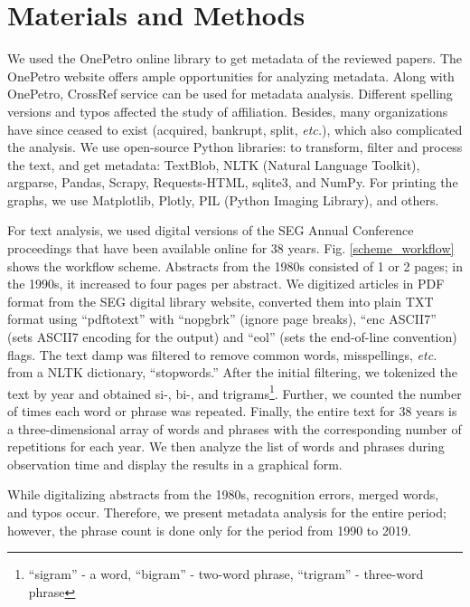 \documentclass[geosciences,article,submit,moreauthors,pdftex]{Definitions/mdpi}
\begin{document}
\section{Materials and Methods}

We used the OnePetro online library \citep{SPE2019} to get metadata of the reviewed papers. The OnePetro website offers ample opportunities for analyzing metadata. Along with OnePetro, CrossRef service can be used for metadata analysis. Different spelling versions and typos affected the study of affiliation. Besides, many organizations have since ceased to exist (acquired, bankrupt, split, \textit{etc.}), which also complicated the analysis. We use open-source Python libraries: to transform, filter and process the text, and get metadata: TextBlob, NLTK (Natural Language Toolkit), argparse, Pandas, Scrapy, Requests-HTML, sqlite3, and NumPy. For printing the graphs, we use Matplotlib, Plotly, PIL (Python Imaging Library), and others.

For text analysis, we used digital versions of the SEG Annual Conference proceedings that have been available online for 38 years. Fig. \ref{scheme_workflow} shows the workflow scheme. Abstracts from the 1980s consisted of 1 or 2 pages; in the 1990s, it increased to four pages per abstract. We digitized articles in PDF format from the SEG digital library website, converted them into plain TXT format using ``pdftotext'' with ``nopgbrk'' (ignore page breaks), ``enc ASCII7'' (sets ASCII7 encoding for the output) and ``eol'' (sets the end-of-line convention) flags. The text damp was filtered to remove common words, misspellings, \textit{etc.} from a NLTK dictionary, ``stopwords.'' After the initial filtering, we tokenized the text by year and obtained si-, bi-, and trigrams\footnote{``sigram'' - a word, ``bigram'' - two-word phrase, ``trigram'' - three-word phrase}. Further, we counted the number of times each word or phrase was repeated. Finally, the entire text for 38 years is a three-dimensional array of words and phrases with the corresponding number of repetitions for each year. We then analyze the list of words and phrases during observation time and display the results in a graphical form.

While digitalizing abstracts from the 1980s, recognition errors, merged words, and typos occur. Therefore, we present metadata analysis for the entire period; however, the phrase count is done only for the period from 1990 to 2019.
\end{document}
